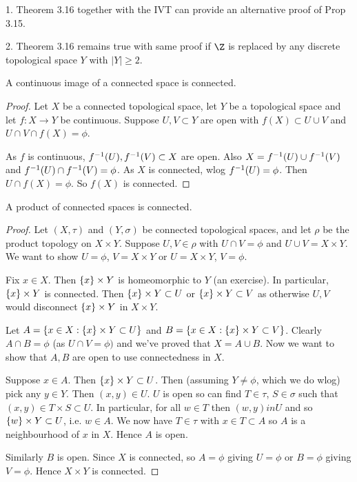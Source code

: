 \begin{remark}
1. Theorem 3.16 together with the IVT can provide an alternative proof of Prop 3.15.

2. Theorem 3.16 remains true with same proof if $\Z$ is replaced by any discrete topological space $Y$ with $|Y|\geq 2$.
\end{remark}

\begin{proposition}
A continuous image of a connected space is connected.
\end{proposition}
\begin{proof}
Let $X$ be a connected topological space, let $Y$ be a topological space and let $f:X\to Y$ be continuous. Suppose $U,V\subset Y$ are open with $f(X)\subset U\cup V$ and $U\cap V\cap f(X) = \phi$.

As $f$ is continuous, $f^{-1}(U),f^{-1}(V)\subset X$ are open. Also $X = f^{-1}(U)\cup f^{-1}(V)$ and $f^{-1}(U) \cap f^{-1}(V)=\phi$. As $X$ is connected, wlog $f^{-1}(U)= \phi$. Then $U\cap f(X)=\phi$. So $f(X)$ is connected.
\end{proof}
\begin{proposition}
A product of connected spaces is connected.
\end{proposition}
\begin{proof}
Let $(X,\tau)$ and $(Y,\sigma)$ be connected topological spaces, and let $\rho$ be the product topology on $X\times Y$. Suppose $U,V\in\rho$ with $U\cap V=\phi$ and $U\cup V = X\times Y$. We want to show $U=\phi$, $V=X\times Y$ or $U=X\times Y$, $V=\phi$.

Fix $x\in X$. Then $\{x\}\times Y$ is homeomorphic to $Y$ (an exercise). In particular, $\{x\}\times Y$ is connected. Then $\{x\}\times Y\subset U$ or $\{x\}\times Y \subset V$ as otherwise $U,V$ would disconnect $\{x\}\times Y$ in $X\times Y$.

Let $A = \{x\in X : \{x\}\times Y\subset U\}$ and $B = \{x\in X : \{x\}\times Y \subset V\}$. Clearly $A\cap B = \phi$ (as $U\cap V = \phi)$ and we've proved that $X = A\cup B$. Now we want to show that $A,B$ are open to use connectedness in $X$.

Suppose $x\in A$. Then $\{x\}\times Y\subset U$. Then (assuming $Y\neq \phi$, which we do wlog) pick any $y\in Y$. Then $(x,y)\in U$. $U$ is open so can find $T\in \tau$, $S\in \sigma$ such that $(x,y)\in T\times S \subset U$. In particular, for all $w\in T$ then $(w,y)in U$ and so $\{w\}\times Y\subset U$, i.e. $w\in A$. We now have $T\in \tau$ with $x\in T\subset A$ so $A$ is a neighbourhood of $x$ in $X$. Hence $A$ is open.

Similarly $B$ is open. Since $X$ is connected, so $A=\phi$ giving $U=\phi$ or $B=\phi$ giving $V=\phi$. Hence $X\times Y$ is connected.
\end{proof}

